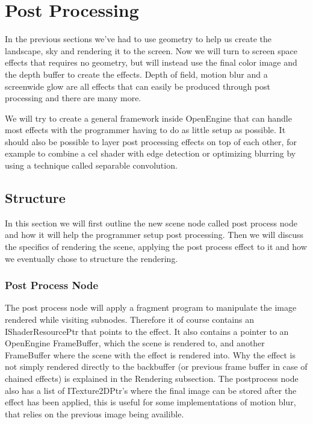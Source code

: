 \chapter{Post Processing}


In the previous sections we've had to use geometry to help us create the
landscape, sky and rendering it to the screen. Now we will turn to
screen space effects that requires no geometry, but will instead use
the final color image and the depth buffer to create the
effects. Depth of field, motion blur and a screenwide glow are all
effects that can easily be produced through post processing and there
are many more.


We will try to create a general framework inside OpenEngine that can
handle most effects with the programmer having to do as little setup
as possible. It should also be possible to layer post processing
effects on top of each other, for example to combine a cel shader with
edge detection or optimizing blurring by using a technique called
separable convolution.

\section{Structure}

In this section we will first outline the new scene node called post
process node and how it will help the programmer setup post
processing. Then we will discuss the specifics of rendering the scene,
applying the post process effect to it and how we eventually chose to
structure the rendering.

\subsection*{Post Process Node}

The post process node will apply a fragment program to manipulate the
image rendered while visiting subnodes. Therefore it of course
contains an IShaderResourcePtr that points to the effect. It also
contains a pointer to an OpenEngine FrameBuffer, which the scene is
rendered to, and another FrameBuffer where the scene with the effect
is rendered into. Why the effect is not simply rendered directly to
the backbuffer (or previous frame buffer in case of chained effects)
is explained in the Rendering subsection. The postprocess node also
has a list of ITexture2DPtr's where the final image can be stored
after the effect has been applied, this is useful for some
implementations of motion blur, that relies on the previous image
being availible.

